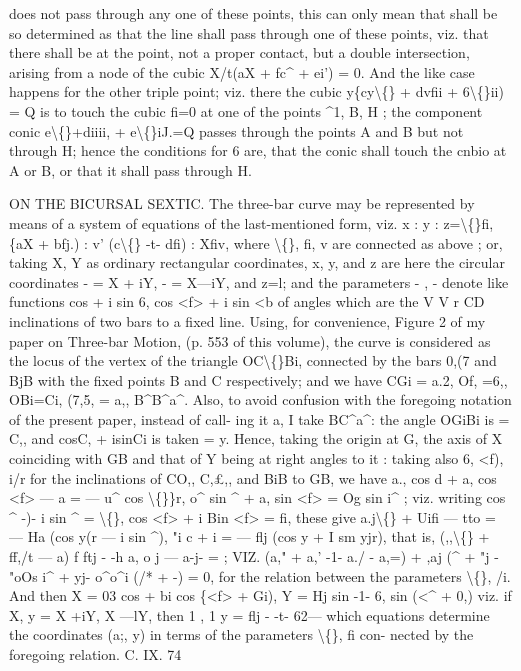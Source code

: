 \documentclass[12pt,a4paper]{article}
\begin{document}
does
not
pass
through
any
one
of
these
points,
this
can
only mean
that
shall
be
so
determined
as
that
the
line
shall
pass
through
one
of
these
points,
viz.
that
there
shall
be
at
the
point, not
a
proper
contact,
but
a
double
intersection,
arising
from
a
node
of
the
cubic
X/t(aX + fc\textasciicircum{} + ei') = 0.
And
the
like
case
happens
for
the
other
triple
point;
viz.
there the cubic
y\{cy\textbackslash\{\} + dvfii + 6\textbackslash\{\}ii) = Q
is
to
touch
the
cubic
fi=0
at
one
of
the
points
\textasciicircum{}1,
B, H
;
the
component
conic
e\guillemotright{}\textbackslash\{\}+diiii, + e\textbackslash\{\}iJ.=Q
passes
through
the
points A
and B
but
not
through H;
hence
the
conditions
for
6
are,
that the conic
shall touch the cnbio at A
or B,
or that
it shall pass through H.

ON THE BICURSAL SEXTIC.
The
three-bar
curve may
be
represented
by
means
of
a
system
of
equations
of
the
last-mentioned
form,
viz. x
: y
: z=\textbackslash\{\}fi, \{aX + bfj.)
:
v' (c\textbackslash\{\} -t- dfi)
: Xfiv, where \textbackslash\{\},
fi,
v
are
connected
as
above
;
or,
taking
X, Y
as
ordinary
rectangular
coordinates,
x,
y, and
z
are
here
the
circular
coordinates - = X + iY, - = X---iY, and z=l;
and
the parameters
-
,
-
denote
like
functions
cos
+ i sin 6,
cos
<f> + i sin
<b
of
angles
which
are
the
V
V
r
CD
inclinations
of two bars
to
a
fixed
line.
Using,
for
convenience,
Figure
2
of my paper
on
Three-bar
Motion,
(p.
553
of
this
volume),
the curve
is
considered
as
the
locus
of
the vertex
of the triangle
OC\textbackslash\{\}Bi, connected by the
bars
0,(7 and BjB with the
fixed
points B and C respectively; and we have CGi = a.2, Of, =6,, OBi=Ci,
(7,5, = a,, B\textasciicircum{}B\textasciicircum{}a\textasciicircum{}.
Also,
to avoid
confusion with
the foregoing notation
of the present paper,
instead of call-
ing
it
a,
I
take BC\textasciicircum{}a\textasciicircum{}:
the angle OGiBi
is = C,, and cosC, + isinCi
is taken = y.
Hence,
taking the
origin
at
G,
the
axis
of X coinciding with GB
and
that
of Y
being
at
right
angles
to
it
:
taking
also
6,
<f),
i/r
for the
inclinations
of CO,,
C,\pounds{},, and
BiB
to GB, we have
a., cos d + a, cos
<f> --- a = --- u\textasciicircum{} cos \textbackslash\{\}\}r,
o\textasciicircum{} sin \textasciicircum{} + a, sin
<f>
=
Og sin i\textasciicircum{}
;
viz.
writing cos \textasciicircum{} -)- i sin \textasciicircum{} = \textbackslash\{\}, cos <f> + i Bin
<f> = fi, these give
a.j\textbackslash\{\} + Uifi --- tto = --- Ha (cos y(r --- i sin \textbullet{}\textasciicircum{}),
"i c + \guillemotleft{}i
\guillemotleft{}\guillemotright{} = --- flj (cos y + I sm yjr),
that
is,
(\guillemotleft{},,\textbackslash\{\} + ff,/t --- a)
f ftj -
-h a,
\guillemotleft{}o j --- a-j- =
;
VIZ.
(a," + a,' -1- a./ - a,=) + \guillemotleft{},aj (\textasciicircum{} + "j - "oOs i\textasciicircum{} + yj- o\textasciicircum{}o\textasciicircum{}i (/* + -) = 0,
for the
relation between the parameters
\textbackslash\{\},
/i.
And then
X = 03 cos
+ bi cos \{<f> + Gi),
Y = Hj sin
-1- 6, sin (<\textasciicircum{} + 0,)
viz.
if X, y = X +iY, X ---lY, then
1
,
1
y = flj -
-t- 62---
which equations determine
the
coordinates
(a;, y)
in
terms
of
the
parameters
\textbackslash\{\},
fi
con-
nected by the foregoing relation.
C.
IX.
74
\end{document}
